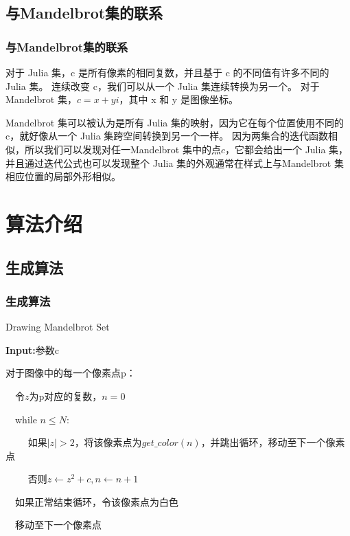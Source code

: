 \documentclass[11pt]{beamer}																										\usetheme{Madrid}
\begin{document}
\subsection{与Mandelbrot集的联系}
\begin{frame}[fragile]
	\frametitle{与Mandelbrot集的联系}
	对于 Julia 集，c 是所有像素的相同复数，并且基于 c 的不同值有许多不同的 Julia 集。
连续改变 c，我们可以从一个 Julia 集连续转换为另一个。
对于 Mandelbrot 集，$c = x + yi$，其中 x 和 y 是图像坐标。 

	Mandelbrot 集可以被认为是所有 Julia 集的映射，因为它在每个位置使用不同的 c，就好像从一个 Julia 集跨空间转换到另一个一样。
因为两集合的迭代函数相似，所以我们可以发现对任一Mandelbrot 集中的点$c$，它都会给出一个 Julia 集，
并且通过迭代公式也可以发现整个 Julia 集的外观通常在样式上与Mandelbrot 集相应位置的局部外形相似。\cite{https://complex-analysis.com/}
\end{frame}

\section{算法介绍}
\subsection{生成算法}
\begin{frame}[fragile]
\frametitle{生成算法}
	\begin{algorithm}[H]
	\caption{Drawing Mandelbrot Set}
	\label{alg1}
	\textbf{Input:}参数c\par
	对于图像中的每一个像素点p：\par
	$\quad$令$z$为p对应的复数，$n=0$\par
	$\quad $while $n \le N$:\par
	$\qquad$ 如果$|z| > 2$，将该像素点为$get\_color(n)$，并跳出循环，移动至下一个像素点\par
	$\qquad$ 否则$z \leftarrow z^2 + c,n \leftarrow n+1$\par
	$\quad$如果正常结束循环，令该像素点为白色\par
	$\quad$移动至下一个像素点
	\end{algorithm}

\end{frame}
\end{document}
